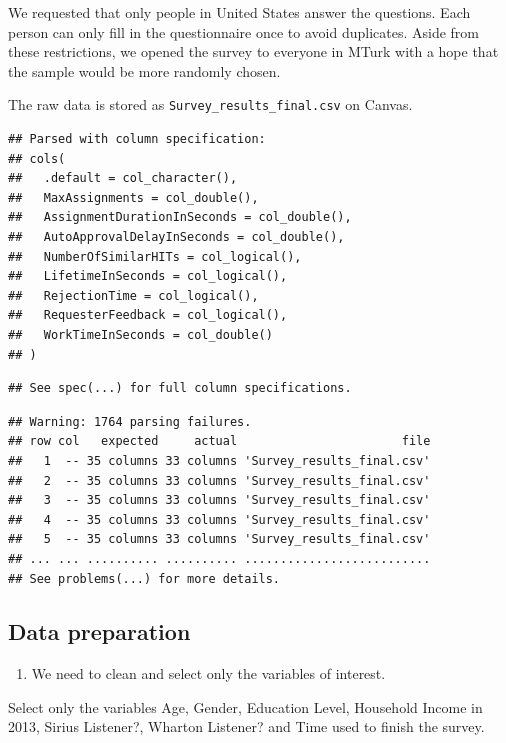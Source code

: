 \documentclass[
]{article}
\providecommand{\tightlist}{%
  \setlength{\itemsep}{0pt}\setlength{\parskip}{0pt}}
\begin{document}
We requested that only people in United States answer the questions.
Each person can only fill in the questionnaire once to avoid duplicates.
Aside from these restrictions, we opened the survey to everyone in MTurk
with a hope that the sample would be more randomly chosen.

The raw data is stored as \texttt{Survey\_results\_final.csv} on Canvas.

\begin{verbatim}
## Parsed with column specification:
## cols(
##   .default = col_character(),
##   MaxAssignments = col_double(),
##   AssignmentDurationInSeconds = col_double(),
##   AutoApprovalDelayInSeconds = col_double(),
##   NumberOfSimilarHITs = col_logical(),
##   LifetimeInSeconds = col_logical(),
##   RejectionTime = col_logical(),
##   RequesterFeedback = col_logical(),
##   WorkTimeInSeconds = col_double()
## )
\end{verbatim}

\begin{verbatim}
## See spec(...) for full column specifications.
\end{verbatim}

\begin{verbatim}
## Warning: 1764 parsing failures.
## row col   expected     actual                       file
##   1  -- 35 columns 33 columns 'Survey_results_final.csv'
##   2  -- 35 columns 33 columns 'Survey_results_final.csv'
##   3  -- 35 columns 33 columns 'Survey_results_final.csv'
##   4  -- 35 columns 33 columns 'Survey_results_final.csv'
##   5  -- 35 columns 33 columns 'Survey_results_final.csv'
## ... ... .......... .......... ..........................
## See problems(...) for more details.
\end{verbatim}

\hypertarget{data-preparation}{%
\subsection{Data preparation}\label{data-preparation}}

\begin{enumerate}
\def\labelenumi{\roman{enumi}.}
\tightlist
\item
  We need to clean and select only the variables of interest.
\end{enumerate}

Select only the variables Age, Gender, Education Level, Household Income
in 2013, Sirius Listener?, Wharton Listener? and Time used to finish the
survey.
\end{document}
